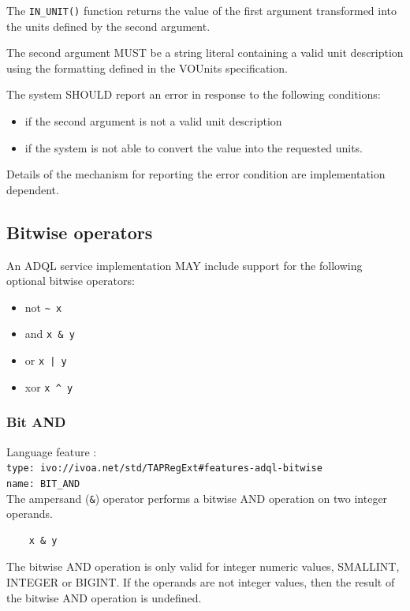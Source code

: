 \documentclass[11pt,a4paper]{ivoa}
\newcommand{\VOUnitSpec}{VOUnits specification\xspace}
\begin{document}
The \verb:IN_UNIT(): function returns the value of the first argument
transformed into the units defined by the second argument.

The second argument MUST be a string literal containing a valid unit
description using the formatting defined in the \VOUnitSpec.

The system SHOULD report an error in response to the following conditions:
\begin{itemize}
    \item if the second argument is not a valid unit description
    \item if the system is not able to convert the value into the requested units.
\end{itemize}

Details of the mechanism for reporting the error condition are
implementation dependent.

\subsection{Bitwise operators}
\label{sec:bitwise}

An ADQL service implementation MAY include support for the following optional
bitwise operators:

\begin{itemize}
    \item not \verb:~ x:
    \item and \verb:x & y: 
    \item or  \verb:x | y:
    \item xor \verb:x ^ y:
\end{itemize}

\subsubsection{Bit AND}
\label{sec:bitwise.and}
{\footnotesize Language feature :}\\
{\footnotesize \verb|type: ivo://ivoa.net/std/TAPRegExt#features-adql-bitwise|}\\
{\footnotesize \verb|name: BIT_AND|}\\

The ampersand (\verb:&:) operator performs a bitwise AND operation
on two integer operands.

\begin{verbatim}
    x & y
\end{verbatim}

The bitwise AND operation is only valid for integer numeric values,
SMALLINT, INTEGER or BIGINT.
If the operands are not integer values, then the result of the bitwise
AND operation is undefined.
\end{document}
